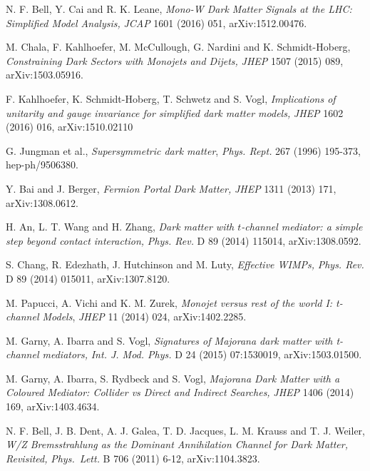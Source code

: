  N. F. Bell, Y. Cai and R. K. Leane,
  \emph{Mono-W Dark Matter Signals at the LHC: Simplified Model Analysis,}
  \emph{JCAP} 1601 (2016) 051, arXiv:1512.00476.

 M. Chala, F. Kahlhoefer, M. McCullough, G. Nardini and K. Schmidt-Hoberg,
\emph{Constraining Dark Sectors with Monojets and Dijets,}
  \emph{JHEP} 1507 (2015) 089,
  arXiv:1503.05916. %

 F. Kahlhoefer, K. Schmidt-Hoberg, T. Schwetz and S. Vogl,
\emph{Implications of unitarity and gauge invariance for simplified dark matter models,}
  \emph{JHEP} 1602 (2016) 016, arXiv:1510.02110

 G. Jungman et al., \emph{Supersymmetric dark matter}, \emph{Phys. Rept.} 267 (1996) 195-373, hep-ph/9506380.

 Y. Bai and J. Berger,
  \emph{Fermion Portal Dark Matter,}
  \emph{JHEP} 1311 (2013) 171,
  arXiv:1308.0612. %

 H. An, L. T. Wang and H. Zhang,
  \emph{Dark matter with $t$-channel mediator: a simple step beyond contact interaction,}
  \emph{Phys. Rev.} D 89 (2014) 115014,
  arXiv:1308.0592. %

 S. Chang, R. Edezhath, J. Hutchinson and M. Luty,
  \emph{Effective WIMPs,}
  \emph{Phys. Rev.} D 89 (2014) 015011,
  arXiv:1307.8120. %

 M. Papucci, A. Vichi and K. M. Zurek, \emph{Monojet versus rest of the world I: t-channel Models}, \emph{JHEP} 11 (2014) 024, arXiv:1402.2285.

 M. Garny, A. Ibarra and S. Vogl,
  \emph{Signatures of Majorana dark matter with t-channel mediators,}
  \emph{Int. J. Mod. Phys.} D 24 (2015) 07:1530019,
  arXiv:1503.01500. %

 M. Garny, A. Ibarra, S. Rydbeck and S. Vogl,
  \emph{Majorana Dark Matter with a Coloured Mediator: Collider vs Direct and Indirect Searches,}
  \emph{JHEP} 1406 (2014) 169,
  arXiv:1403.4634. %

 N. F. Bell, J. B. Dent, A. J. Galea, T. D. Jacques, L. M. Krauss and T. J. Weiler,
  \emph{W/Z Bremsstrahlung as the Dominant Annihilation Channel for Dark Matter, Revisited,}
  \emph{Phys.\ Lett.} B 706 (2011) 6-12,
  arXiv:1104.3823. %

